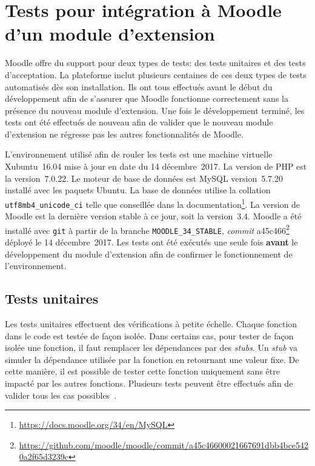 \chapter{Tests pour int\'egration \`a Moodle d'un module d'extension}
Moodle offre du support pour deux types de tests: des tests unitaires et des tests d'acceptation.
La plateforme inclut plusieurs centaines de ces deux types de tests automatis\'es d\`es son installation.
Ils ont tous effectu\'es avant le d\'ebut du d\'eveloppement afin de s'assurer que Moodle fonctionne correctement sans la pr\'esence du nouveau module d'extension.
Une fois le d\'eveloppement termin\'e, les tests ont \'et\'e effectu\'es de nouveau afin de valider que le nouveau module d'extension ne r\'egresse pas les autres fonctionnalit\'es de Moodle.

L'environnement utilis\'e afin de rouler les tests est une machine virtuelle Xubuntu~16.04 mise \`a jour en date du 14 d\'ecembre~2017.
La version de PHP est la version~7.0.22.
Le moteur de base de donn\'ees est MySQL version~5.7.20 install\'e avec les paquets Ubuntu.
La base de donn\'ees utilise la collation \texttt{utf8mb4\_unicode\_ci} telle que conseill\'ee dans la documentation\footnote{\url{https://docs.moodle.org/34/en/MySQL}}.
La version de Moodle est la derni\`ere version stable \`a ce jour, soit la version~3.4.
Moodle a \'et\'e install\'e avec \texttt{git} \`a partir de la branche \texttt{MOODLE\_34\_STABLE}, \textit{commit} a45c466\footnote{\url{https://github.com/moodle/moodle/commit/a45c46600021667691dbb4bce5420a2f65d3239c}} d\'eploy\'e le 14 d\'ecembre~2017.
Les tests ont \'et\'e ex\'ecut\'es une seule fois \textbf{avant} le d\'eveloppement du module d'extension afin de confirmer le fonctionnement de l'environnement.

\section{Tests unitaires}
\label{test-unitaires}
Les tests unitaires effectuent des v\'erifications \`a petite \'echelle.
Chaque fonction dans le code est test\'ee de fa\c{c}on isol\'ee.
Dans certains cas, pour tester de fa\c{c}on isol\'ee une fonction, il faut remplacer les d\'ependances par des \textit{stubs}.
Un \textit{stub} va simuler la d\'ependance utilis\'ee par la fonction en retournant une valeur fixe.
De cette mani\`ere, il est possible de tester cette fonction uniquement sans \^etre impact\'e par les autres fonctions.
Plusieurs tests peuvent \^etre effectu\'es afin de valider tous les cas possibles~\cite{tremblay16}.

